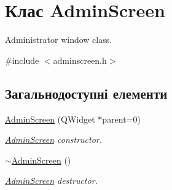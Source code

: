 \hypertarget{classAdminScreen}{\section{Клас Admin\-Screen}
\label{classAdminScreen}
}


Administrator window class.  




{\ttfamily \#include $<$adminscreen.\-h$>$}

\subsection*{Загальнодоступні елементи}
\begin{DoxyCompactItemize}
\item 
\hyperlink{classAdminScreen_afacdce9a29c025265097914529ff5619}{Admin\-Screen} (Q\-Widget $\ast$parent=0)
\begin{DoxyCompactList}\small\item\em \hyperlink{classAdminScreen}{Admin\-Screen} constructor. \end{DoxyCompactList}\item 
\hypertarget{classAdminScreen_afaf1ed51e4a07af841c11f0f354ad2ed}{\hyperlink{classAdminScreen_afaf1ed51e4a07af841c11f0f354ad2ed}{$\sim$\-Admin\-Screen} ()}\label{classAdminScreen_afaf1ed51e4a07af841c11f0f354ad2ed}

\begin{DoxyCompactList}\small\item\em \hyperlink{classAdminScreen}{Admin\-Screen} destructor. \end{DoxyCompactList}\end{DoxyCompactItemize}
